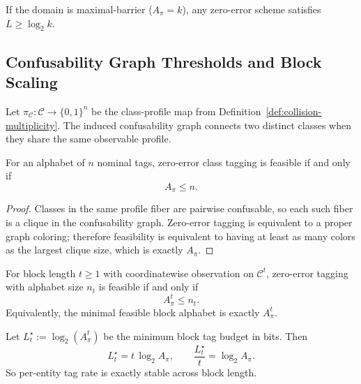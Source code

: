 \begin{corollary}
\label{cor:max-barrier-converse}
If the domain is maximal-barrier ($A_\pi = k$), any zero-error scheme satisfies $L \ge \log_2 k$.
\end{corollary}

\subsection{Confusability Graph Thresholds and Block Scaling}

Let $\pi_{\mathcal{C}} : \mathcal{C} \to \{0,1\}^n$ be the class-profile map from Definition~\ref{def:collision-multiplicity}. The induced confusability graph connects two distinct classes when they share the same observable profile.

\begin{theorem}
\label{thm:graph-one-shot-threshold}
For an alphabet of $n$ nominal tags, zero-error class tagging is feasible if and only if
\[
A_\pi \le n.
\]
\end{theorem}

\begin{proof}
Classes in the same profile fiber are pairwise confusable, so each such fiber is a clique in the confusability graph. Zero-error tagging is equivalent to a proper graph coloring; therefore feasibility is equivalent to having at least as many colors as the largest clique size, which is exactly $A_\pi$.
\end{proof}

\begin{theorem}
\label{thm:graph-block-threshold}
For block length $t\ge 1$ with coordinatewise observation on $\mathcal{C}^t$, zero-error tagging with alphabet size $n_t$ is feasible if and only if
\[
A_\pi^t \le n_t.
\]
Equivalently, the minimal feasible block alphabet is exactly $A_\pi^t$.
\end{theorem}

\begin{corollary}
\label{cor:graph-logbit-scaling}
Let $L_t^\star := \log_2(A_\pi^t)$ be the minimum block tag budget in bits. Then
\[
L_t^\star = t\,\log_2 A_\pi,
\qquad
\frac{L_t^\star}{t} = \log_2 A_\pi.
\]
So per-entity tag rate is exactly stable across block length.
\end{corollary}

